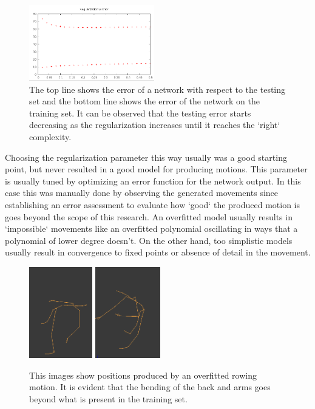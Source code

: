 \documentclass[letterpaper,9pt]{article}
\begin{document}
\begin{figure}[h!]
  \centering
    \includegraphics[height=125px]{Extra/regularization_vs_error.png}
    \caption[Error and Regularization]{The top line shows the error of a network with respect to the testing set and the bottom line shows the error of the network on the training set. It can be observed that the testing error starts decreasing as the regularization increases until it reaches the `right` complexity.}
\end{figure}

Choosing the regularization parameter this way usually was a good starting point, but never resulted in a good model for producing motions. This parameter is usually tuned by optimizing an error function for the network output. In this case this was manually done by observing the generated movements since establishing an error assessment to evaluate how `good` the produced motion is goes beyond the scope of this research. An overfitted model usually results in `impossible` movements like an overfitted polynomial oscillating in ways that a polynomial of lower degree doesn't. On the other hand, too simplistic models usually result in convergence to fixed points or absence of detail in the movement.

\begin{figure}[h!]
  \centering
  \includegraphics[height=150px]{Extra/overfitting_1.png}
  \includegraphics[height=150px]{Extra/overfitting_2.png}
  \caption[Error and Regularization]{This images show positions produced by an overfitted rowing motion. It is evident that the bending of the back and arms goes beyond what is present in the training set.}
\end{figure}
\end{document}
